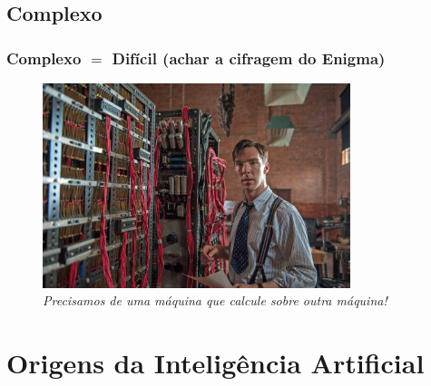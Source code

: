 \documentclass{beamer}
\begin{document}



\subsection{Complexo}
\begin{frame}

\frametitle{Complexo $=$ Difícil (achar a cifragem do Enigma)}

\begin{figure}[ht!]
 \centering
 \includegraphics[width=0.8\textwidth , height=0.67\textheight]{figures/the_imitation_game_01.jpg}

\caption{\textit{Precisamos de uma máquina que calcule sobre outra máquina!}} 

\end{figure}


\end{frame}




\section{Origens da Inteligência Artificial}
\end{document}
